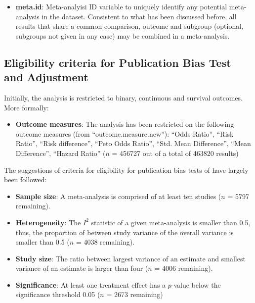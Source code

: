 \begin{itemize}
\item \textbf{meta.id}: Meta-analyisi ID variable to uniquely identify any potential meta-analysis in the dataset. Consistent to what has been discussed before, all results that share a common comparison, outcome and subgroup (optional, subgroups not given in any case) may be combined in a meta-analysis.
\end{itemize}


\subsection{Eligibility criteria for Publication Bias Test and Adjustment}
Initially, the analysis is restricted to binary, continuous and survival outcomes. More formally:
\begin{itemize}
\item \textbf{Outcome measures}: The analysis has been restricted on the following outcome measures (from ``outcome.measure.new''): ``Odds Ratio'', ``Risk Ratio'', ``Risk difference'', ``Peto Odds Ratio'', ``Std. Mean Difference'', ``Mean Difference'', ``Hazard Ratio'' 
($n$ = 456727 out of a total of 463820 results)
\end{itemize}

The suggestions of criteria for eligibility for publication bias tests of \citet{Ioannidis2007} have largely been followed:
\begin{itemize}
\item \textbf{Sample size}: A meta-analysis is comprised of at least ten studies ($n$ = 5797 remaining). 
\item \textbf{Heterogeneity}: The $I^2$ statistic of a given meta-analysis is smaller than 0.5, thus, the proportion of between study variance of the overall variance is smaller than 0.5 ($n$ = 4038 remaining).
\item \textbf{Study size}: The ratio between largest variance of an estimate and smallest variance of an estimate is larger than four ($n$ = 4006 remaining).
\item \textbf{Significance}: At least one treatment effect has a $p$-value below the significance threshold 0.05 ($n$ = 2673 remaining)
\end{itemize}

